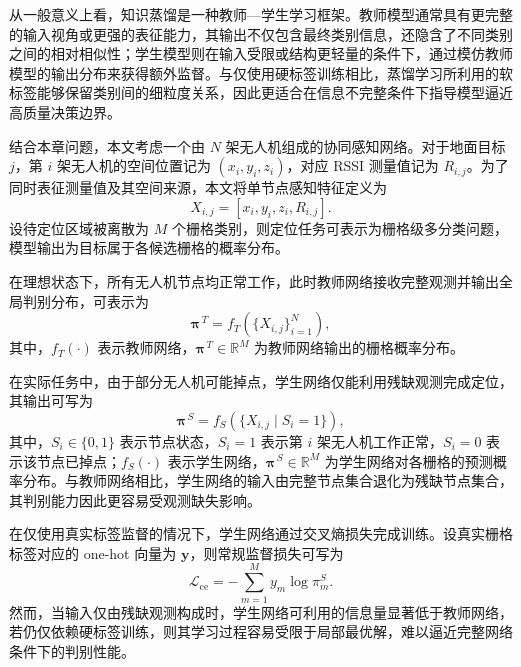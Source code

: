 从一般意义上看，知识蒸馏是一种教师—学生学习框架。教师模型通常具有更完整的输入视角或更强的表征能力，其输出不仅包含最终类别信息，还隐含了不同类别之间的相对相似性；学生模型则在输入受限或结构更轻量的条件下，通过模仿教师模型的输出分布来获得额外监督。与仅使用硬标签训练相比，蒸馏学习所利用的软标签能够保留类别间的细粒度关系，因此更适合在信息不完整条件下指导模型逼近高质量决策边界。

结合本章问题，本文考虑一个由 \(N\) 架无人机组成的协同感知网络。对于地面目标 \(j\)，第 \(i\) 架无人机的空间位置记为 \((x_i,y_i,z_i)\)，对应 RSSI 测量值记为 \(R_{i,j}\)。为了同时表征测量值及其空间来源，本文将单节点感知特征定义为
\begin{equation}
X_{i,j}=[x_i,y_i,z_i,R_{i,j}].
\label{eq:4_44_single_node_feature}
\end{equation}
\noindent 设待定位区域被离散为 \(M\) 个栅格类别，则定位任务可表示为栅格级多分类问题，模型输出为目标属于各候选栅格的概率分布。

在理想状态下，所有无人机节点均正常工作，此时教师网络接收完整观测并输出全局判别分布，可表示为
\begin{equation}
\boldsymbol{\pi}^{\,T}
=
f_T(\{X_{i,j}\}_{i=1}^{N}),
\label{eq:4_48_teacher_output}
\end{equation}
其中，\(f_T(\cdot)\) 表示教师网络，\(\boldsymbol{\pi}^{\,T}\in\mathbb{R}^{M}\) 为教师网络输出的栅格概率分布。

在实际任务中，由于部分无人机可能掉点，学生网络仅能利用残缺观测完成定位，其输出可写为
\begin{equation}
\boldsymbol{\pi}^{\,S}
=
f_S(\{X_{i,j}\mid S_i=1\}),
\label{eq:4_51_student_output}
\end{equation}
其中，\(S_i\in\{0,1\}\) 表示节点状态，\(S_i=1\) 表示第 \(i\) 架无人机工作正常，\(S_i=0\) 表示该节点已掉点；\(f_S(\cdot)\) 表示学生网络，\(\boldsymbol{\pi}^{\,S}\in\mathbb{R}^{M}\) 为学生网络对各栅格的预测概率分布。与教师网络相比，学生网络的输入由完整节点集合退化为残缺节点集合，其判别能力因此更容易受观测缺失影响。

在仅使用真实标签监督的情况下，学生网络通过交叉熵损失完成训练。设真实栅格标签对应的 one-hot 向量为 \(\mathbf{y}\)，则常规监督损失可写为
\begin{equation}
\mathcal{L}_{\mathrm{ce}}
=
-\sum_{m=1}^{M} y_m \log \pi^{S}_{m}.
\label{eq:4_52_ce}
\end{equation}
然而，当输入仅由残缺观测构成时，学生网络可利用的信息量显著低于教师网络，若仍仅依赖硬标签训练，则其学习过程容易受限于局部最优解，难以逼近完整网络条件下的判别性能。

